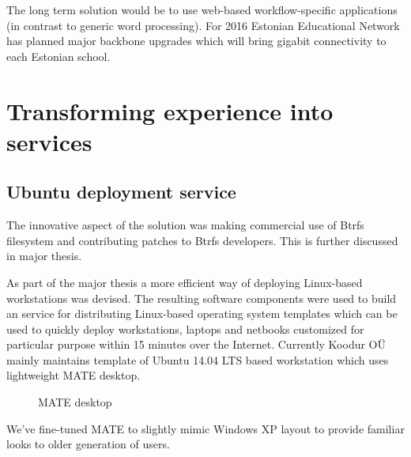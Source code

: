 \documentclass{article}
\begin{document}
The long term solution would be to use web-based
workflow-specific applications (in contrast
to generic word processing).
For 2016 Estonian Educational Network has planned major
backbone upgrades which will bring gigabit connectivity to each
Estonian school.


\section{Transforming experience into services}

\subsection{Ubuntu deployment service}

The innovative aspect of the solution was making
commercial use of Btrfs filesystem and contributing patches
to Btrfs developers.
This is further discussed in major thesis.

As part of the major thesis a more efficient way of deploying Linux-based
workstations was devised.
The resulting software components were used to build an service for
distributing Linux-based operating system templates which can be used to
quickly deploy workstations, laptops and netbooks customized
for particular purpose within 15 minutes over the Internet.
Currently Koodur OÜ mainly maintains template of Ubuntu 14.04 LTS based
workstation which uses lightweight MATE desktop.

\begin{figure}[!htb]
\centering
{}
\caption{MATE desktop}
\label{fig:mate}
\end{figure}

We've fine-tuned MATE to slightly mimic Windows XP layout to provide
familiar looks to older generation of users.
\end{document}

